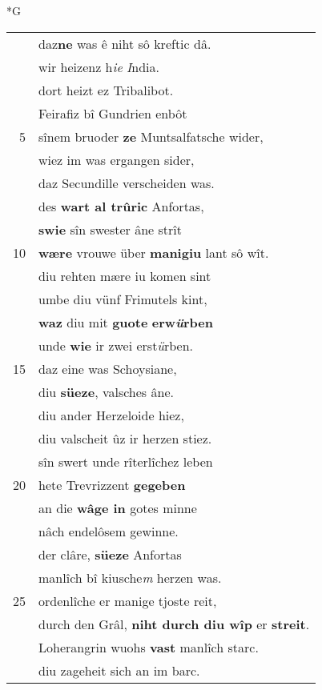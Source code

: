 \documentclass[8pt,a4paper,notitlepage]{article}
\begin{document}
\begin{table}[ht]
\begin{minipage}[t]{0.5\linewidth}
\small
\begin{center}*G
\end{center}
\begin{tabular}{rl}
 & daz\textbf{ne} was ê niht sô kreftic dâ.\\ 
 & wir heizenz h\textit{ie} \textit{I}ndia.\\ 
 & dort heizt ez Tribalibot.\\ 
 & Feirafiz bî Gundrien enbôt\\ 
5 & sînem bruoder \textbf{ze} Muntsalfatsche wider,\\ 
 & wiez im was ergangen sider,\\ 
 & daz Secundille verscheiden was.\\ 
 & des \textbf{wart al trûric} Anfortas,\\ 
 & \textbf{swie} sîn swester âne strît\\ 
10 & \textbf{wære} vrouwe über \textbf{manigiu} lant sô wît.\\ 
 & diu rehten mære iu komen sint\\ 
 & umbe diu vünf Frimutels kint,\\ 
 & \textbf{waz} diu mit \textbf{guote} \textbf{erw\textit{ü}rben}\\ 
 & unde \textbf{wie} ir zwei erst\textit{ü}rben.\\ 
15 & daz eine was Schoysiane,\\ 
 & diu \textbf{süeze}, valsches âne.\\ 
 & diu ander Herzeloide hiez,\\ 
 & diu valscheit ûz ir herzen stiez.\\ 
 & sîn swert unde rîterlîchez leben\\ 
20 & hete Trevrizzent \textbf{gegeben}\\ 
 & an die \textbf{wâge in} gotes minne\\ 
 & nâch endelôsem gewinne.\\ 
 & der clâre, \textbf{süeze} Anfortas\\ 
 & manlîch bî kiusche\textit{m} herzen was.\\ 
25 & ordenlîche er manige tjoste reit,\\ 
 & durch den Grâl, \textbf{niht durch diu wîp} er \textbf{streit}.\\ 
 & Loherangrin wuohs \textbf{vast} manlîch starc.\\ 
 & diu zageheit sich an im barc.\\ 

\end{tabular}
\end{minipage}
\end{table}
\end{document}
